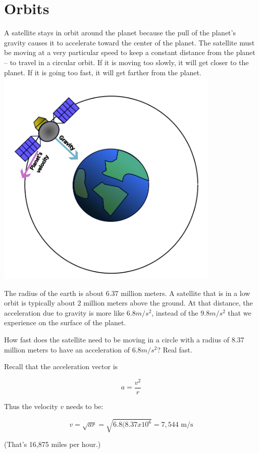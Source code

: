 \chapter{Orbits}

A satellite stays in orbit around the planet because the pull of the
planet's gravity causes it to accelerate toward the center of the
planet. The satellite must be moving at a very particular speed to keep a
constant distance from the planet -- to travel in a circular orbit.
If it is moving too slowly, it will get closer to the planet.  If it
is going too fast, it will get farther from the planet.
\includegraphics[width=0.8\textwidth]{orbit.png}

The radius of the earth is about 6.37 million meters. A satellite that
is in a low orbit is typically about 2 million meters above the
ground. At that distance, the acceleration due to gravity is more like
$6.8 m/s^2$, instead of the $9.8 m/s^2$ that we experience on the
surface of the planet.

How fast does the satellite need to be moving in a circle with a
radius of 8.37 million meters to have an acceleration of $6.8 m/s^2$? Real fast.

Recall that the acceleration vector is

$$a = \frac{v^2}{r}$$

Thus the velocity $v$ needs to be:

$$v = \sqrt{a r} = \sqrt{6.8(8.37 x 10^6} = 7,544 \text{ m/s}$$

(That's 16,875 miles per hour.)

